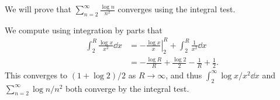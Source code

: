 \begin{example}
	We will prove that $\sum_{n = 2}^{\infty} \frac{\log n}{n^2}$ converges using the integral test.

	We compute using integration by parts that
	\begin{align*}
		\int_2^R \frac{\log x}{x^2} \dd x &= -\left.\frac{\log x}{x} \right|_2^R + \int_2^R \frac{1}{x^2} \dd x \\
		&= - \frac{\log R}{R} + \frac{\log 2}{2} - \frac{1}{R} + \frac{1}{2}.
	\end{align*}
	This converges to $(1 + \log 2)/2$ as $R \rightarrow \infty$, and thus $\int_2^{\infty} \log x/x^2 \dd x$ and $\sum_{n = 2}^{\infty} \log n/n^2$ both converge by the integral test.
\end{example}